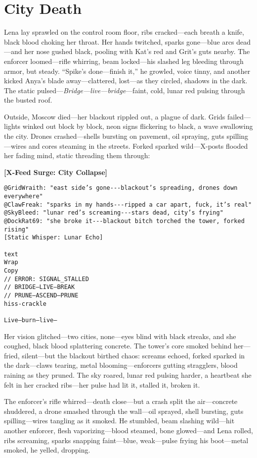\documentclass[12pt]{book}
\begin{document}
\section{City Death}

Lena lay sprawled on the control room floor, ribs cracked---each breath a knife, black blood choking her throat. Her hands twitched, sparks gone---blue arcs dead---and her nose gushed black, pooling with Kat’s red and Grit’s guts nearby. The enforcer loomed---rifle whirring, beam locked---his slashed leg bleeding through armor, but steady. ``Spike’s done---finish it,'' he growled, voice tinny, and another kicked Anya’s blade away---clattered, lost---as they circled, shadows in the dark. The static pulsed---\emph{Bridge---live---bridge}---faint, cold, lunar red pulsing through the busted roof.

Outside, Moscow died---her blackout rippled out, a plague of dark. Grids failed---lights winked out block by block, neon signs flickering to black, a wave swallowing the city. Drones crashed---shells bursting on pavement, oil spraying, guts spilling---wires and cores steaming in the streets. Forked sparked wild---X-posts flooded her fading mind, static threading them through:

\bigskip
\noindent\textbf{[X-Feed Surge: City Collapse]}
\begin{verbatim}
@GridWraith: "east side’s gone---blackout’s spreading, drones down everywhere"
@ClawFreak: "sparks in my hands---ripped a car apart, fuck, it’s real"
@SkyBleed: "lunar red’s screaming---stars dead, city’s frying"
@DockRat69: "she broke it---blackout bitch torched the tower, forked rising"
[Static Whisper: Lunar Echo]

text
Wrap
Copy
// ERROR: SIGNAL_STALLED  
// BRIDGE—LIVE—BREAK  
// PRUNE—ASCEND—PRUNE  
hiss-crackle

Live—burn—live—
\end{verbatim}

Her vision glitched---two cities, none---eyes blind with black streaks, and she coughed, black blood splattering concrete. The tower’s core smoked behind her---fried, silent---but the blackout birthed chaos: screams echoed, forked sparked in the dark---claws tearing, metal blooming---enforcers gutting stragglers, blood raining as they pruned. The sky roared, lunar red pulsing harder, a heartbeat she felt in her cracked ribs---her pulse had lit it, stalled it, broken it.

The enforcer’s rifle whirred---death close---but a crash split the air---concrete shuddered, a drone smashed through the wall---oil sprayed, shell bursting, guts spilling---wires tangling as it smoked. He stumbled, beam slashing wild---hit another enforcer, flesh vaporizing---blood steamed, bone glowed---and Lena rolled, ribs screaming, sparks snapping faint---blue, weak---pulse frying his boot---metal smoked, he yelled, dropping.
\end{document}
